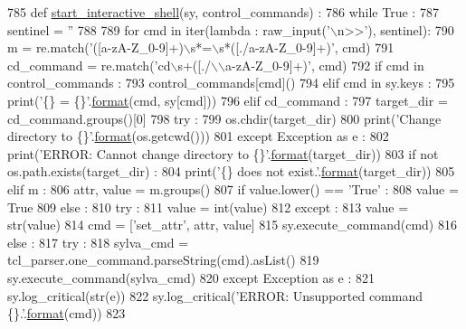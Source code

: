 \begin{DoxyCode}
785 \textcolor{keyword}{def }\hyperlink{namespacesylva_1_1misc_1_1exec_a75779a3eb47b91a0f69020b264c0bd2d}{start\_interactive\_shell}(sy, control\_commands) :
786   \textcolor{keywordflow}{while} \textcolor{keyword}{True} :
787     sentinel = \textcolor{stringliteral}{''}
788 
789     \textcolor{keywordflow}{for} cmd \textcolor{keywordflow}{in} iter(\textcolor{keyword}{lambda} : raw\_input(\textcolor{stringliteral}{'\(\backslash\)n>>'}), sentinel):
790       m = re.match(\textcolor{stringliteral}{'([a-zA-Z\_0-9]+)\(\backslash\)s*=\(\backslash\)s*([./a-zA-Z\_0-9]+)'}, cmd)
791       cd\_command = re.match(\textcolor{stringliteral}{'cd\(\backslash\)s+([./\(\backslash\)\(\backslash\)a-zA-Z\_0-9]+)'}, cmd)
792       \textcolor{keywordflow}{if} cmd \textcolor{keywordflow}{in} control\_commands :
793         control\_commands[cmd]()
794       \textcolor{keywordflow}{elif} cmd \textcolor{keywordflow}{in} sy.keys :
795         print(\textcolor{stringliteral}{'\{\} = \{\}'}.\hyperlink{namespacesylva_1_1examples_1_1hsdfg_ab3510a0b8457362330aa4d9fd2209590}{format}(cmd, sy[cmd]))
796       \textcolor{keywordflow}{elif} cd\_command :
797         target\_dir = cd\_command.groups()[0]
798         \textcolor{keywordflow}{try} :
799           os.chdir(target\_dir)
800           print(\textcolor{stringliteral}{'Change directory to \{\}'}.\hyperlink{namespacesylva_1_1examples_1_1hsdfg_ab3510a0b8457362330aa4d9fd2209590}{format}(os.getcwd()))
801         \textcolor{keywordflow}{except} Exception \textcolor{keyword}{as} e :
802           print(\textcolor{stringliteral}{'ERROR: Cannot change directory to \{\}'}.\hyperlink{namespacesylva_1_1examples_1_1hsdfg_ab3510a0b8457362330aa4d9fd2209590}{format}(target\_dir))
803           \textcolor{keywordflow}{if} \textcolor{keywordflow}{not} os.path.exists(target\_dir) :
804             print(\textcolor{stringliteral}{'\{\} does not exist.'}.\hyperlink{namespacesylva_1_1examples_1_1hsdfg_ab3510a0b8457362330aa4d9fd2209590}{format}(target\_dir))
805       \textcolor{keywordflow}{elif} m :
806         attr, value = m.groups()
807         \textcolor{keywordflow}{if} value.lower() == \textcolor{stringliteral}{'True'} :
808           value = \textcolor{keyword}{True}
809         \textcolor{keywordflow}{else} :
810           \textcolor{keywordflow}{try} :
811             value = int(value)
812           \textcolor{keywordflow}{except} :
813             value = str(value)
814         cmd = [\textcolor{stringliteral}{'set\_attr'}, attr, value]
815         sy.execute\_command(cmd)
816       \textcolor{keywordflow}{else} :
817         \textcolor{keywordflow}{try} :
818           sylva\_cmd = tcl\_parser.one\_command.parseString(cmd).asList()
819           sy.execute\_command(sylva\_cmd)
820         \textcolor{keywordflow}{except} Exception \textcolor{keyword}{as} e :
821           sy.log\_critical(str(e))
822           sy.log\_critical(\textcolor{stringliteral}{'ERROR: Unsupported command \{\}.'}.\hyperlink{namespacesylva_1_1examples_1_1hsdfg_ab3510a0b8457362330aa4d9fd2209590}{format}(cmd))
823 
\end{DoxyCode}


